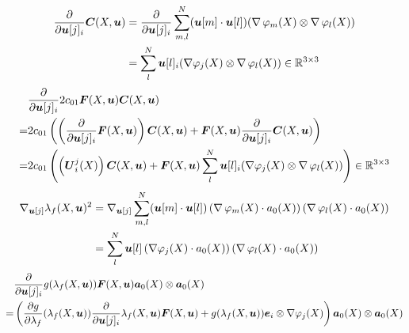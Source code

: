\begin{align*}
	\d{}{\vu[j]_i}\vC(X,\vu) &= \d{}{\vu[j]_i}\suml{m,l}{N} (\vu[m] \cdot \vu[l])(\divergence\varphi_m(X) \otimes \divergence\varphi_l(X))\\
	&= \suml{l}{N} \vu[l]_i(\dpj \otimes \divergence\varphi_l(X))\in\R^{3\times 3}
\end{align*}
\begin{align*}
	&\d{}{\vu[j]_i}2c_{01}\vF(X,\vu)\vC(X,\vu)\\
	=& 2c_{01}\left(\left(\d{}{\vu[j]_i}\vF(X,\vu)\right)\vC(X,\vu) + \vF(X,\vu)\d{}{\vu[j]_i}\vC(X,\vu)\right)\\
	=& 2c_{01}\left(\left(\vU^j_i(X)\right)\vC(X,\vu)
	+ \vF(X,\vu)\suml{l}{N} \vu[l]_i(\dpj \otimes \divergence\varphi_l(X))\right)\in\R^{3\times 3}
\end{align*}
\begin{align*}
	\nabla_{\vu[j]}\lambda_f(X,\vu)^2 &= \nabla_{\vu[j]}\suml{m,l}{N} (\vu[m] \cdot \vu[l])\left(\divergence\varphi_m(X)\cdot a_0(X)\right)(\divergence\varphi_l(X)\cdot a_0(X))\\
	&= \suml{l}{N} \vu[l]\left(\dpj\cdot a_0(X)\right)(\divergence\varphi_l(X)\cdot a_0(X))\\
\end{align*}
\begin{align*}
	  & \d{}{\vu[j]_i} g(\lambda_f(X,\vu))\vF(X,\vu)\va_0(X)\otimes\va_0(X)\\
	 =& \left( \d{g}{\lambda_f}(\lambda_f(X,\vu))\d{}{\vu[j]_i}\lambda_f(X,\vu)\vF(X,\vu) + g(\lambda_f(X,\vu))\ve_i\otimes\dpj\right)\va_0(X)\otimes\va_0(X) 
\end{align*}
